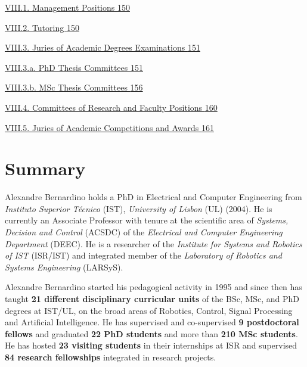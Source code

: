 \documentclass[
]{article}
\begin{document}
\hyperref[management-positions]{VIII.1. Management Positions
\hyperref[management-positions]{150}}

\hyperref[tutoring-1]{VIII.2. Tutoring \hyperref[tutoring-1]{150}}

\hyperref[juries-of-academic-degrees-examinations]{VIII.3. Juries of
Academic Degrees Examinations
\hyperref[juries-of-academic-degrees-examinations]{151}}

\hyperref[phd-thesis-committees]{VIII.3.a. PhD Thesis Committees
\hyperref[phd-thesis-committees]{151}}

\hyperref[msc-thesis-committees]{VIII.3.b. MSc Thesis Committees
\hyperref[msc-thesis-committees]{156}}

\hyperref[committees-of-research-and-faculty-positions]{VIII.4.
Committees of Research and Faculty Positions
\hyperref[committees-of-research-and-faculty-positions]{160}}

\hyperref[juries-of-academic-competitions-and-awards]{VIII.5. Juries of
Academic Competitions and Awards
\hyperref[juries-of-academic-competitions-and-awards]{161}}

\section{}\label{section}

\section*{Summary}\label{summary}

Alexandre Bernardino holds a PhD in Electrical and Computer Engineering
from \emph{Instituto Superior Técnico} (IST), \emph{University of
Lisbon} (UL) (2004). He is currently an Associate Professor with tenure
at the scientific area of \emph{Systems, Decision and Control} (ACSDC)
of the \emph{Electrical and Computer Engineering Department} (DEEC). He
is a researcher of the \emph{Institute for Systems and Robotics of IST}
(ISR/IST) and integrated member of the \emph{Laboratory of Robotics and
Systems Engineering} (LARSyS).

Alexandre Bernardino started his pedagogical activity in 1995 and since
then has taught \textbf{21 different disciplinary curricular units} of
the BSc, MSc, and PhD degrees at IST/UL, on the broad areas of Robotics,
Control, Signal Processing and Artificial Intelligence. He has
supervised and co-supervised \textbf{9 postdoctoral fellows} and
graduated \textbf{22 PhD students} and more than \textbf{210 MSc
students}. He has hosted \textbf{23 visiting students} in their
internships at ISR and supervised \textbf{84 research fellowships}
integrated in research projects.
\end{document}
